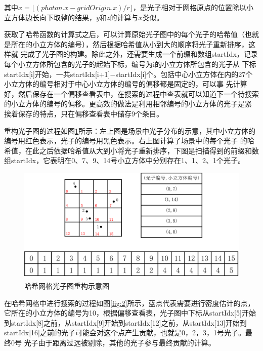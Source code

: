 \documentclass[UTF8]{ctexart}
\begin{document}
        其中$x=\lfloor(photon.x-gridOrigin.x)/r\rfloor$，是光子相对于网格原点的位置除以小立方体边长向下取整的结果，$y$和$z$的计算与$x$类似。
        
        获取了哈希函数的计算式之后，可以计算原始光子图中的每个光子的哈希值（也就是所在的小立方体的编号），然后根据哈希值从小到大的顺序将光子重新排序，这样就
        完成了光子图的构建。除此之外，还需要生成一个前缀和数组startIdx，记录每个小立方体所包含的光子的起始下标，编号为i的小立方体所包含的光子从
        下标startIdx[i]开始，一共startIdx[i+1]$-$startIdx[i]个。包括中心小立方体在内的27个小立方体的编号相对于中心小立方体的编号的偏移都是固定的，可以事
        先计算好，然后保存在一个偏移查看表中，在搜索的过程中查表就可以知道下一个待搜索的小立方体的编号的偏移。更高效的做法是利用相邻编号的小立方体的光子是紧
        挨着保存的特点，只在偏移查看表中储存9个条目。
        
        重构光子图的过程如图\ref{fig:1}所示：左上图是场景中光子分布的示意，其中小立方体的编号用红色表示，光子的编号用黑色表示。右上图计算了场景中的每个光子
        的哈希值，在此之后依据哈希值从大到小将光子重新排序，下图是扫描得到的前缀和数组startIdx，它表明在0、7、9、14号小立方体中分别存在1、1、2、1个光子。
        
        \begin{figure}[htbp]
            \centering
            \includegraphics[scale=0.6]{pic/HashGridPhotonRebuild.png}
            \caption{哈希网格光子图重构示意图}
            \label{fig:1}
        \end{figure}
        
        在哈希网格中进行搜索的过程如图\ref{fig:2}所示，蓝点代表需要进行密度估计的点，它所在的小立方体的编号为10，根据偏移查看表，光子图中下标从startIdx[5]开始
        到startIdx[8]之前，从startIdx[9]开始到startIdx[12]之前，从startIdx[13]开始到startIdx[16]之前的光子可能会对这个点产生贡献，也就是0，2，3，1号光子。最终0号
        光子由于距离过远被剔除，其他的光子参与最终贡献的计算。
        
\end{document}
